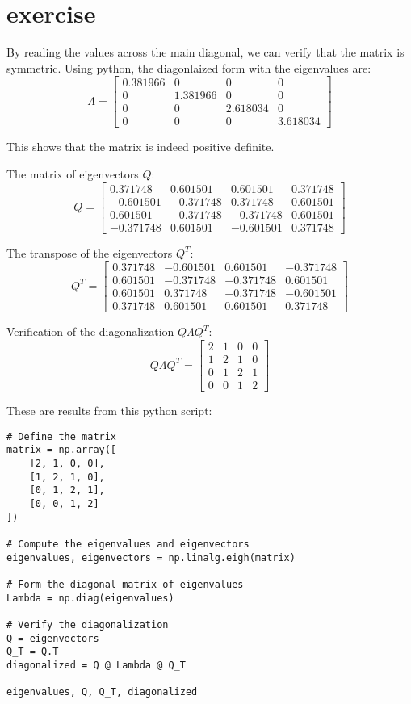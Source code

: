 \documentclass{article}
\begin{document}
\section{exercise}

By reading the values across the main diagonal, we can verify that the matrix is symmetric.
Using python, the diagonlaized form with the eigenvalues are:
\[ \Lambda = \begin{bmatrix}
        0.381966 & 0        & 0        & 0        \\
        0        & 1.381966 & 0        & 0        \\
        0        & 0        & 2.618034 & 0        \\
        0        & 0        & 0        & 3.618034
    \end{bmatrix} \]

This shows that the matrix is indeed positive definite.

The matrix of eigenvectors \( Q \):
\[ Q = \begin{bmatrix}
        0.371748  & 0.601501  & 0.601501  & 0.371748 \\
        -0.601501 & -0.371748 & 0.371748  & 0.601501 \\
        0.601501  & -0.371748 & -0.371748 & 0.601501 \\
        -0.371748 & 0.601501  & -0.601501 & 0.371748
    \end{bmatrix} \]

The transpose of the eigenvectors \( Q^T \):
\[ Q^T = \begin{bmatrix}
        0.371748 & -0.601501 & 0.601501  & -0.371748 \\
        0.601501 & -0.371748 & -0.371748 & 0.601501  \\
        0.601501 & 0.371748  & -0.371748 & -0.601501 \\
        0.371748 & 0.601501  & 0.601501  & 0.371748
    \end{bmatrix} \]

Verification of the diagonalization \( Q \Lambda Q^T \):
\[ Q \Lambda Q^T = \begin{bmatrix}
        2 & 1 & 0 & 0 \\
        1 & 2 & 1 & 0 \\
        0 & 1 & 2 & 1 \\
        0 & 0 & 1 & 2
    \end{bmatrix} \]

These are results from this python script:
\begin{lstlisting}
# Define the matrix
matrix = np.array([
    [2, 1, 0, 0],
    [1, 2, 1, 0],
    [0, 1, 2, 1],
    [0, 0, 1, 2]
])

# Compute the eigenvalues and eigenvectors
eigenvalues, eigenvectors = np.linalg.eigh(matrix)

# Form the diagonal matrix of eigenvalues
Lambda = np.diag(eigenvalues)

# Verify the diagonalization
Q = eigenvectors
Q_T = Q.T
diagonalized = Q @ Lambda @ Q_T

eigenvalues, Q, Q_T, diagonalized

\end{lstlisting}
\end{document}
